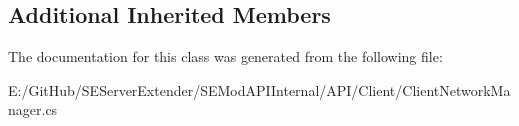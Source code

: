 \subsection*{Additional Inherited Members}


The documentation for this class was generated from the following file\+:\begin{DoxyCompactItemize}
\item 
E\+:/\+Git\+Hub/\+S\+E\+Server\+Extender/\+S\+E\+Mod\+A\+P\+I\+Internal/\+A\+P\+I/\+Client/Client\+Network\+Manager.\+cs\end{DoxyCompactItemize}
